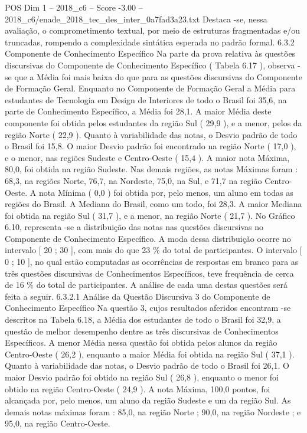 \begin{textsample}{POS Dim 1 – 2018\_c6 – Score -3.00 – 2018\_c6/enade\_2018\_tec\_des\_inter\_0a7fad3a23.txt}
Destaca -se, nessa avaliação, o comprometimento textual, por meio de estruturas fragmentadas e/ou truncadas, rompendo a complexidade sintática esperada no padrão formal. 6.3.2 Componente de Conhecimento Específico Na parte da prova relativa às questões discursivas do Componente de Conhecimento Específico ( Tabela 6.17 ), observa -se que a Média foi mais baixa do que para as questões discursivas do Componente de Formação Geral.
Enquanto no Componente de Formação Geral a Média para estudantes de Tecnologia em Design de Interiores de todo o Brasil foi 35,6, na parte de Conhecimento Específico, a Média foi 28,1.
A maior Média deste componente foi obtida pelos estudantes da região Sul ( 29,9 ), e a menor, pelos da região Norte ( 22,9 ).
Quanto à variabilidade das notas, o Desvio padrão de todo o Brasil foi 15,8.
O maior Desvio padrão foi encontrado na região Norte ( 17,0 ), e o menor, nas regiões Sudeste e Centro-Oeste ( 15,4 ).
A maior nota Máxima, 80,0, foi obtida na região Sudeste.
Nas demais regiões, as notas Máximas foram : 68,3, na regiões Norte, 76,7, na Nordeste, 75,0, na Sul, e 71,7 na região Centro-Oeste.
A nota Mínima ( 0,0 ) foi obtida por, pelo menos, um aluno em todas as regiões do Brasil.
A Mediana do Brasil, como um todo, foi 28,3.
A maior Mediana foi obtida na região Sul ( 31,7 ), e a menor, na região Norte ( 21,7 ).
No Gráfico 6.10, representa -se a distribuição das notas nas questões discursivas no Componente de Conhecimento Específico.
A moda dessa distribuição ocorre no intervalo [ 20 ; 30 ], com mais do que 23 \% do total de participantes.
O intervalo [ 0 ; 10 ], no qual estão computadas as ocorrências de respostas em branco para as três questões discursivas de Conhecimentos Específicos, teve frequência de cerca de 16 \% do total de participantes.
A análise de cada uma destas questões será feita a seguir. 6.3.2.1 Análise da Questão Discursiva 3 do Componente de Conhecimento Específico Na questão 3, cujos resultados aferidos encontram -se descritos na Tabela 6.18, a Média dos estudantes de todo o Brasil foi 32,9, a questão de melhor desempenho dentre as três discursivas de Conhecimentos Específicos.
A menor Média nessa questão foi obtida pelos alunos da região Centro-Oeste ( 26,2 ), enquanto a maior Média foi obtida na região Sul ( 37,1 ).
Quanto à variabilidade das notas, o Desvio padrão de todo o Brasil foi 26,1.
O maior Desvio padrão foi obtido na região Sul ( 26,8 ), enquanto o menor foi obtido na região Centro-Oeste ( 24,9 ).
A nota Máxima, 100,0 pontos, foi alcançada por, pelo menos, um aluno da região Sudeste e um da região Sul.
As demais notas máximas foram : 85,0, na região Norte ; 90,0, na região Nordeste ; e 95,0, na região Centro-Oeste.

\end{textsample}
